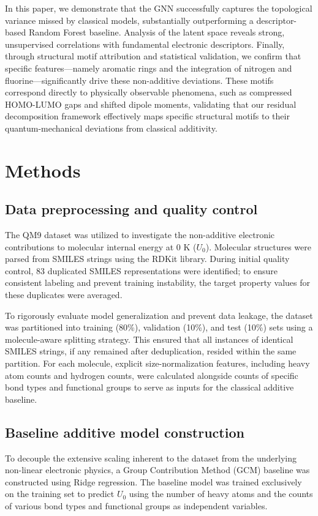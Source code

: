 \documentclass[]{article}
\begin{document}
In this paper, we demonstrate that the GNN successfully captures the topological variance missed by classical models, substantially outperforming a descriptor-based Random Forest baseline. Analysis of the latent space reveals strong, unsupervised correlations with fundamental electronic descriptors. Finally, through structural motif attribution and statistical validation, we confirm that specific features—namely aromatic rings and the integration of nitrogen and fluorine—significantly drive these non-additive deviations. These motifs correspond directly to physically observable phenomena, such as compressed HOMO-LUMO gaps and shifted dipole moments, validating that our residual decomposition framework effectively maps specific structural motifs to their quantum-mechanical deviations from classical additivity.

\section{Methods}
\label{sec:methods}
\subsection{Data preprocessing and quality control}
The QM9 dataset was utilized to investigate the non-additive electronic contributions to molecular internal energy at 0 K ($U_0$). Molecular structures were parsed from SMILES strings using the RDKit library. During initial quality control, 83 duplicated SMILES representations were identified; to ensure consistent labeling and prevent training instability, the target property values for these duplicates were averaged. 

To rigorously evaluate model generalization and prevent data leakage, the dataset was partitioned into training (80\%), validation (10\%), and test (10\%) sets using a molecule-aware splitting strategy. This ensured that all instances of identical SMILES strings, if any remained after deduplication, resided within the same partition. For each molecule, explicit size-normalization features, including heavy atom counts and hydrogen counts, were calculated alongside counts of specific bond types and functional groups to serve as inputs for the classical additive baseline.

\subsection{Baseline additive model construction}
To decouple the extensive scaling inherent to the dataset from the underlying non-linear electronic physics, a Group Contribution Method (GCM) baseline was constructed using Ridge regression. The baseline model was trained exclusively on the training set to predict $U_0$ using the number of heavy atoms and the counts of various bond types and functional groups as independent variables. 
\end{document}
